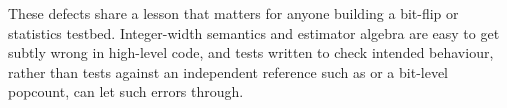 These defects share a lesson that matters for anyone building a bit-flip or statistics testbed.
Integer-width semantics and estimator algebra are easy to get subtly wrong in high-level code,
and tests written to check intended behaviour, rather than tests against an independent
reference such as  or a bit-level popcount, can let such errors through.
